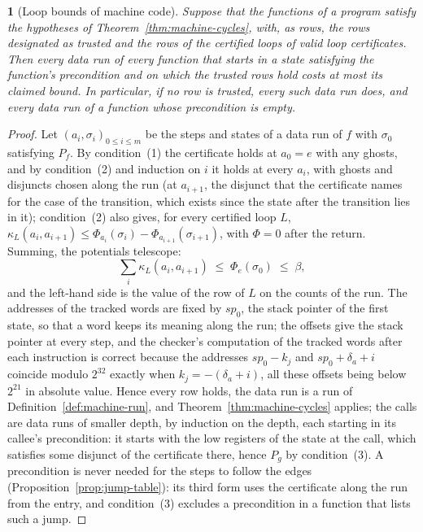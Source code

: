 \documentclass[oneside,english]{amsart}
\numberwithin{equation}{section}
\theoremstyle{plain}
\newtheorem{thm}{\protect\theoremname}
\theoremstyle{definition}
\theoremstyle{plain}
\theoremstyle{plain}
\theoremstyle{remark}
\providecommand{\theoremname}{Theorem}
\begin{document}
\begin{thm}[Loop bounds of machine code]
\label{thm:machine-loops}
Suppose that the functions of a program satisfy the hypotheses of Theorem~\ref{thm:machine-cycles}, with, as rows, the rows designated as trusted and the rows of the certified loops of valid loop certificates. Then every data run of every function that starts in a state satisfying the function's precondition and on which the trusted rows hold costs at most its claimed bound. In particular, if no row is trusted, every such data run does, and every data run of a function whose precondition is empty.
\end{thm}

\begin{proof}
Let $(a_i, \sigma_i)_{0 \le i \le m}$ be the steps and states of a data run of $f$ with $\sigma_0$ satisfying $P_f$. By condition~(1) the certificate holds at $a_0 = e$ with any ghosts, and by condition~(2) and induction on $i$ it holds at every $a_i$, with ghosts and disjuncts chosen along the run (at $a_{i+1}$, the disjunct that the certificate names for the case of the transition, which exists since the state after the transition lies in it); condition~(2) also gives, for every certified loop $L$, $\kappa_L(a_i, a_{i+1}) \le \Phi_{a_i}(\sigma_i) - \Phi_{a_{i+1}}(\sigma_{i+1})$, with $\Phi = 0$ after the return. Summing, the potentials telescope:
\[
  \sum_{i} \kappa_L(a_i, a_{i+1}) \;\le\; \Phi_e(\sigma_0) \;\le\; \beta,
\]
and the left-hand side is the value of the row of $L$ on the counts of the run. The addresses of the tracked words are fixed by $\mathit{sp}_0$, the stack pointer of the first state, so that a word keeps its meaning along the run; the offsets give the stack pointer at every step, and the checker's computation of the tracked words after each instruction is correct because the addresses $\mathit{sp}_0 - k_j$ and $\mathit{sp}_0 + \delta_a + i$ coincide modulo $2^{32}$ exactly when $k_j = -(\delta_a + i)$, all these offsets being below $2^{21}$ in absolute value. Hence every row holds, the data run is a run of Definition~\ref{def:machine-run}, and Theorem~\ref{thm:machine-cycles} applies; the calls are data runs of smaller depth, by induction on the depth, each starting in its callee's precondition: it starts with the low registers of the state at the call, which satisfies some disjunct of the certificate there, hence $P_g$ by condition~(3). A precondition is never needed for the steps to follow the edges (Proposition~\ref{prop:jump-table}): its third form uses the certificate along the run from the entry, and condition~(3) excludes a precondition in a function that lists such a jump.
\end{proof}
\end{document}
